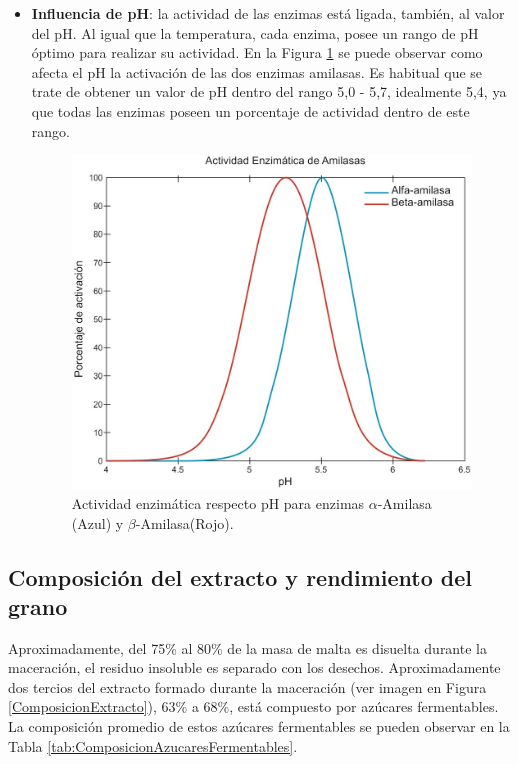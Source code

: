 \begin{itemize}
    	           \item {\textbf{Influencia de pH}:} la actividad de las enzimas está ligada, también, al valor del pH. Al igual que la temperatura, cada enzima, posee un rango de pH óptimo para realizar su actividad. En la Figura \ref{GraficoPhEnzimas} se puede observar como afecta el pH la activación de las dos enzimas amilasas. Es habitual que se trate de obtener un valor de pH dentro del rango 5,0 - 5,7, idealmente 5,4, ya que todas las enzimas poseen un porcentaje de actividad dentro de este rango.
    	              
    	                \begin{figure} [ht]		                                                       \centerline{\includegraphics[scale=0.5]{activacion_pH.jpg}}
		                    \caption{Actividad enzimática respecto pH para enzimas $\alpha$-Amilasa (Azul) y $\beta$-Amilasa(Rojo).}
	                        \label{GraficoPhEnzimas}
    	                \end{figure}

                \end{itemize}
        \subsection{Composición del extracto y rendimiento del grano}
            \par Aproximadamente, del 75\% al 80\% de la masa de malta es disuelta durante la maceración, el residuo insoluble es separado con los desechos. Aproximadamente dos tercios del extracto formado durante la maceración (ver imagen en Figura \ref{ComposicionExtracto}), 63\% a 68\%, está compuesto por azúcares fermentables. La composición promedio de estos azúcares fermentables se pueden observar en la Tabla \ref{tab:ComposicionAzucaresFermentables}.
            
